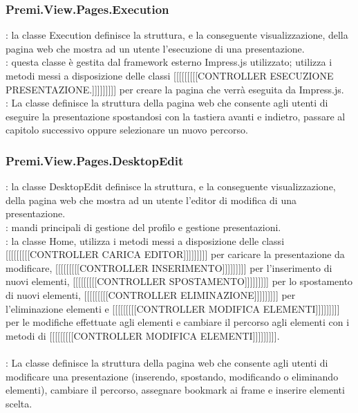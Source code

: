 {		\subsubsection{Premi.View.Pages.Execution}{
			\textbf{\tipo}: la classe Execution definisce la struttura, e la conseguente visualizzazione, della pagina web che mostra ad un utente l'esecuzione di una presentazione.\\
			\textbf{\relaz}: questa classe è gestita dal framework esterno Impress.js utilizzato; utilizza i metodi messi a disposizione delle classi [[[[[[[[[CONTROLLER ESECUZIONE PRESENTAZIONE.]]]]]]]]] per creare la pagina che verrà eseguita da Impress.js.\\
			\textbf{\attivita}: La classe definisce la struttura della pagina web che consente agli utenti di eseguire la presentazione spostandosi con la tastiera avanti e indietro, passare al capitolo successivo oppure selezionare un nuovo percorso.\\
		}
		\subsubsection{Premi.View.Pages.DesktopEdit}{
			\textbf{\tipo}: la classe DesktopEdit definisce la struttura, e la conseguente visualizzazione, della pagina web che mostra ad un utente l'editor di modifica di una presentazione.\\
			\textbf{\relaz}: mandi principali di gestione del profilo e gestione presentazioni.\\	
			\textbf{\relaz}: la classe Home, utilizza i metodi messi a disposizione delle classi [[[[[[[[[CONTROLLER CARICA EDITOR]]]]]]]]] per caricare la presentazione da modificare, [[[[[[[[[CONTROLLER INSERIMENTO]]]]]]]]] per l'inserimento di nuovi elementi, [[[[[[[[[CONTROLLER SPOSTAMENTO]]]]]]]]] per lo spostamento di nuovi elementi, [[[[[[[[[CONTROLLER ELIMINAZIONE]]]]]]]]] per l'eliminazione elementi e [[[[[[[[[CONTROLLER MODIFICA ELEMENTI]]]]]]]]] per le modifiche effettuate agli elementi e cambiare il percorso agli elementi con i metodi di [[[[[[[[[CONTROLLER MODIFICA ELEMENTI]]]]]]]]].\\\\
			\textbf{\attivita}: La classe definisce la struttura della pagina web che consente agli utenti di modificare una presentazione (inserendo, spostando, modificando o eliminando elementi), cambiare il percorso, assegnare bookmark ai frame e inserire elementi scelta.\\
		}
}
